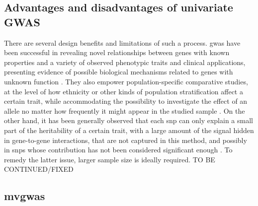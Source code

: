 \subsection{Advantages and disadvantages of univariate GWAS}

There are several design benefits and limitations of such a process. \ac{gwas} have been successful in revealing novel relationships between genes with known properties and a variety of observed phenotypic traits and clinical applications, presenting evidence of possible biological mechanisms related to genes with unknown function \cite{Tam2019}. They also empower population-specific comparative studies, at the level of how ethnicity or other kinds of population stratification affect a certain trait, while accommodating the possibility to investigate the effect of an allele no matter how frequently it might appear in the studied sample \cite{Tam2019}. On the other hand, it has been generally observed  that each \ac{snp} can only explain a small part of the heritability of a certain trait, with a large amount of the signal hidden in gene-to-gene interactions, that are not captured in this method, and possibly in \acp{snp} whose contribution has not been considered significant enough  \cite{Tam2019}. To remedy the latter issue, larger sample size is ideally required. TO BE CONTINUED/FIXED

\subsection{\acl{mvgwas}}

